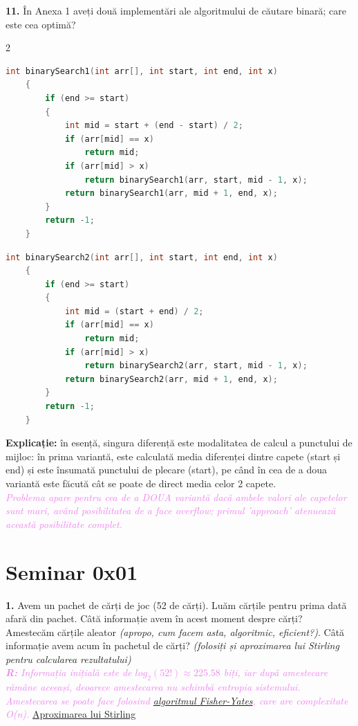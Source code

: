 \documentclass[a4paper]{article}
\newcommand{\hl}[1]{\textcolor{violet}{\textit{#1}}}
\begin{document}
\textbf{11.} În Anexa 1 aveți două implementări ale algoritmului de căutare binară; care este cea optimă?
\begin{multicols}{2}
    \begin{lstlisting}[language=C++]
    int binarySearch1(int arr[], int start, int end, int x)
    {
        if (end >= start)
        {
            int mid = start + (end - start) / 2;
            if (arr[mid] == x)
                return mid;
            if (arr[mid] > x)
                return binarySearch1(arr, start, mid - 1, x);
            return binarySearch1(arr, mid + 1, end, x);
        }
        return -1;
    }
    \end{lstlisting}
    \begin{lstlisting}[language=C++]
    int binarySearch2(int arr[], int start, int end, int x)
    {
        if (end >= start)
        {
            int mid = (start + end) / 2;
            if (arr[mid] == x)
                return mid;
            if (arr[mid] > x)
                return binarySearch2(arr, start, mid - 1, x);
            return binarySearch2(arr, mid + 1, end, x);
        }
        return -1;
    }
    \end{lstlisting}
\end{multicols}
\textbf{Explicație:} în esență, singura diferență este modalitatea de calcul a punctului de mijloc: în prima variantă, este calculată media diferenței dintre capete (start și end) și este însumată punctului de plecare (start), pe când în cea de a doua variantă este făcută cât se poate de direct media celor 2 capete.
\\ \noindent \hl{Problema apare pentru cea de a DOUA variantă dacă ambele valori ale capetelor sunt mari, având posibilitatea de a face overflow; primul 'approach' atenuează această posibilitate complet.}

\vspace{0.5cm}

\section{Seminar 0x01}
\textbf{1.} Avem un pachet de cărți de joc (52 de cărți). Luăm cărțile pentru prima dată afară din pachet. Câtă informație avem în acest moment despre cărți? Amestecăm cărțile aleator \textit{(apropo, cum facem asta, algoritmic, eficient?)}. Câtă informație avem acum în pachetul de cărți? \textit{(folosiți și aproximarea lui Stirling pentru calcularea rezultatului)} \\
\noindent \hl{\textbf{R:} Informația inițială este de $log_2(52!) \approx 225.58$ biți, iar după amestecare rămâne aceeași, deoarece amestecarea nu schimbă entropia sistemului. Amestecarea se poate face folosind \href{https://en.wikipedia.org/wiki/Fisher\%E2\%80\%93Yates_shuffle}{algoritmul Fisher-Yates}, care are complexitate O(n).}
\href{https://en.wikipedia.org/wiki/Stirling\%27s_approximation}{Aproximarea lui Stirling}
\end{document}
